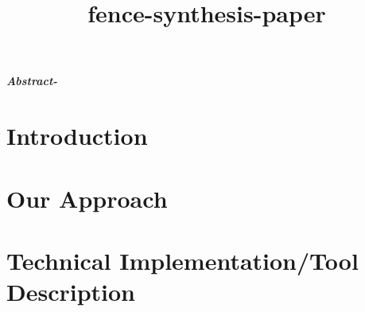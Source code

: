 \documentclass{article}
\title{fence-synthesis-paper}
\date{}
\begin{document}
\maketitle
\textit{\textbf{Abstract-}}

\section{Introduction} \label{sec:intro}


\section{Our Approach}


\section{Technical Implementation/Tool Description}




\end{document}
